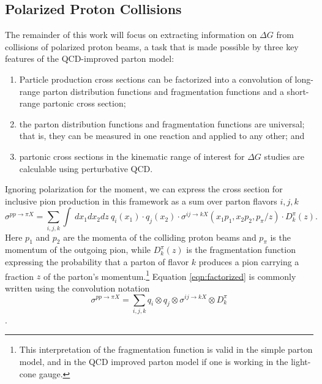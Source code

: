 \subsection{Polarized Proton Collisions}


The remainder of this work will focus on extracting information on $\Delta G$
from collisions of polarized proton beams, a task that is made possible by
three key features of the QCD-improved parton model:

\begin{enumerate}
  \item Particle production cross sections can be factorized into a
  convolution of long-range parton distribution functions and fragmentation
  functions and a short-range partonic cross section;
  \item the parton distribution functions and fragmentation functions are
  universal; that is, they can be measured in one reaction and applied to any
  other; and
  \item partonic cross sections in the kinematic range of interest for $\Delta
  G$ studies are calculable using perturbative QCD.
\end{enumerate}

Ignoring polarization for the moment, we can express the cross section for
inclusive pion production in this framework as a sum over parton flavors
$i,j,k$
%
\begin{equation}
  \sigma^{pp \rightarrow \pi X} = \sum_{i,j,k} \int~dx_1 dx_2 dz~ q_i(x_1) \cdot q_j(x_2) \cdot \sigma^{ij \rightarrow k X}(x_1 p_1,x_2 p_2, p_{\pi}/z) \cdot D_k^\pi(z).
  \label{eqn:factorized}
\end{equation}
%
Here $p_1$ and $p_2$ are the momenta of the colliding proton beams and
$p_{\pi}$ is the momentum of the outgoing pion, while $D_k^{\pi}(z)$ is the
fragmentation function expressing the probability that a parton of flavor $k$
produces a pion carrying a fraction $z$ of the parton's
momentum.\footnote{This interpretation of the fragmentation function is valid
in the simple parton model, and in the QCD improved parton model if one is
working in the light-cone gauge.} Equation \ref{eqn:factorized} is commonly
written using the convolution notation
%
\begin{equation}
  \sigma^{pp \rightarrow \pi X} = \sum_{i,j,k} q_i \otimes q_j \otimes \sigma^{ij \rightarrow kX} \otimes D_k^\pi
\end{equation}.


